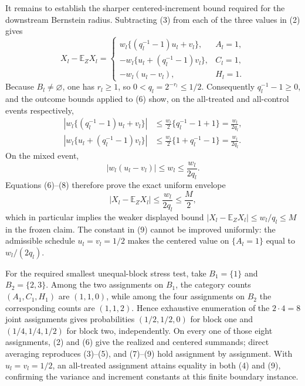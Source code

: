 It remains to establish the sharper centered-increment bound required for
the downstream Bernstein radius.  Subtracting (3) from each of the three
values in (2) gives
\[
 X_l-\mathbb E_ZX_l=
 \begin{cases}
 w_l\{(q_l^{-1}-1)u_l+v_l\},&A_l=1,\\
 -w_l\{u_l+(q_l^{-1}-1)v_l\},&C_l=1,\\
 -w_l(u_l-v_l),&H_l=1.
 \end{cases}
 \tag{6}
\]
Because \(B_l\ne\varnothing\), one has \(r_l\ge1\), so
\(0<q_l=2^{-r_l}\le1/2\).  Consequently \(q_l^{-1}-1\ge0\), and the
outcome bounds applied to (6) show, on the all-treated and all-control
events respectively,
\[
 \begin{aligned}
 \left|w_l\{(q_l^{-1}-1)u_l+v_l\}\right|
 &\le \frac{w_l}{2}\{q_l^{-1}-1+1\}
 =\frac{w_l}{2q_l},\\
 \left|w_l\{u_l+(q_l^{-1}-1)v_l\}\right|
 &\le \frac{w_l}{2}\{1+q_l^{-1}-1\}
 =\frac{w_l}{2q_l}.
 \end{aligned}
 \tag{7}
\]
On the mixed event,
\[
 |w_l(u_l-v_l)|\le w_l\le\frac{w_l}{2q_l}.
 \tag{8}
\]
Equations (6)--(8) therefore prove the exact uniform envelope
\[
 |X_l-\mathbb E_ZX_l|\le\frac{w_l}{2q_l}\le\frac M2,
 \tag{9}
\]
which in particular implies the weaker displayed bound
\(|X_l-\mathbb E_ZX_l|\le w_l/q_l\le M\) in the frozen claim.  The
constant in (9) cannot be improved uniformly: the admissible schedule
\(u_l=v_l=1/2\) makes the centered value on \(\{A_l=1\}\) equal to
\(w_l/(2q_l)\).

For the required smallest unequal-block stress test, take
\(B_1=\{1\}\) and \(B_2=\{2,3\}\).  Among the two assignments on
\(B_1\), the category counts \((A_1,C_1,H_1)\) are \((1,1,0)\), while
among the four assignments on \(B_2\) the corresponding counts are
\((1,1,2)\).  Hence exhaustive enumeration of the \(2\cdot4=8\) joint
assignments gives probabilities \((1/2,1/2,0)\) for block one and
\((1/4,1/4,1/2)\) for block two, independently.  On every one of those
eight assignments, (2) and (6) give the realized and centered summands;
direct averaging reproduces (3)--(5), and (7)--(9) hold assignment by
assignment.  With \(u_l=v_l=1/2\), an all-treated assignment attains
equality in both (4) and (9), confirming the variance and increment
constants at this finite boundary instance.
